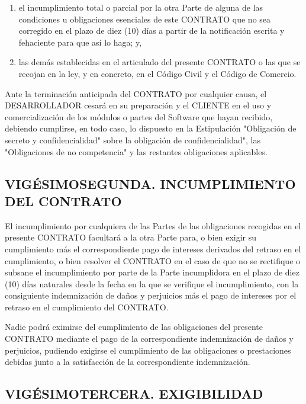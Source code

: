 \documentclass[a4paper,11pt]{report}
\begin{document}
	\begin{enumerate}[label=\Alph*)]
		\item el incumplimiento total o parcial por la otra Parte de alguna de las
		condiciones u obligaciones esenciales de este CONTRATO que no sea
		corregido en el plazo de diez (10) días a partir de la notificación
		escrita y fehaciente para que así lo haga; y,

		\item las demás establecidas en el articulado del presente CONTRATO o las
		que se recojan en la ley, y en concreto, en el Código Civil y el Código
		de Comercio.
	\end{enumerate}

	Ante la terminación anticipada del CONTRATO por cualquier causa, el
	DESARROLLADOR cesará en su preparación y el CLIENTE en el uso y
	comercialización de los módulos o partes del Software que hayan
	recibido, debiendo cumplirse, en todo caso, lo dispuesto en la
	Estipulación "Obligación de secreto y confidencialidad" sobre la
	obligación de confidencialidad", las "Obligaciones de no competencia" y
	las restantes obligaciones aplicables.

	\subsection*{VIGÉSIMOSEGUNDA. INCUMPLIMIENTO DEL CONTRATO}

	El incumplimiento por cualquiera de las Partes de las obligaciones
	recogidas en el presente CONTRATO facultará a la otra Parte para, o bien
	exigir su cumplimiento más el correspondiente pago de intereses
	derivados del retraso en el cumplimiento, o bien resolver el CONTRATO en
	el caso de que no se rectifique o subsane el incumplimiento por parte de
	la Parte incumplidora en el plazo de diez (10) días naturales desde la
	fecha en la que se verifique el incumplimiento, con la consiguiente
	indemnización de daños y perjuicios más el pago de intereses por el
	retraso en el cumplimiento del CONTRATO.

	Nadie podrá eximirse del cumplimiento de las obligaciones del presente
	CONTRATO mediante el pago de la correspondiente indemnización de daños y
	perjuicios, pudiendo exigirse el cumplimiento de las obligaciones o
	prestaciones debidas junto a la satisfacción de la correspondiente
	indemnización.

	\subsection*{VIGÉSIMOTERCERA. EXIGIBILIDAD}
\end{document}
